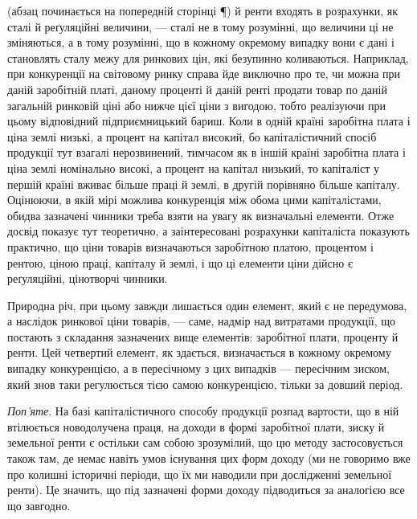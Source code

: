 \parcont{} (абзац починається на попередній сторінці ¶)
й ренти входять в розрахунки, як сталі й реґуляційні величини, — сталі не в тому
розумінні, що величини ці не зміняються, а в тому розумінні, що в кожному окремому
випадку вони є дані і становлять сталу межу для ринкових цін, які безупинно
коливаються. Наприклад, при конкуренції на світовому ринку справа
йде виключно про те, чи можна при даній заробітній платі, даному проценті й
даній ренті продати товар по даній загальній ринковій ціні або нижче цієї ціни
з вигодою, тобто реалізуючи при цьому відповідний підприємницький бариш.
Коли в одній країні заробітна плата і ціна землі низькі, а процент на капітал
високий, бо капіталістичний спосіб продукції тут взагалі нерозвинений,
тимчасом як в іншій країні заробітна плата і ціна землі номінально високі, а
процент на капітал низький, то капіталіст у першій країні вживає більше праці
й землі, в другій порівняно більше капіталу. Оцінюючи, в якій мірі можлива
конкуренція між обома цими капіталістами, обидва зазначені чинники треба
взяти на увагу як визначальні елементи. Отже досвід показує тут теоретично, а
заінтересовані розрахунки капіталіста показують практично, що ціни товарів
визначаються заробітною платою, процентом і рентою, ціною праці, капіталу
й землі, і що ці елементи ціни дійсно є реґуляційні, цінотворчі чинники.

Природна річ, при цьому завжди лишається один елемент, який є не
передумова, а наслідок ринкової ціни товарів, — саме, надмір над витратами продукції, що постають з
складання зазначених вище елементів: заробітної плати,
проценту й ренти. Цей четвертий елемент, як здається, визначається в кожному
окремому випадку конкуренцією, а в пересічному з цих випадків — пересічним
зиском, який знов таки регулюється тією самою конкуренцією, тільки за довший
період.

\emph{Поп’яте}. На базі капіталістичного способу продукції розпад вартости, що
в ній втілюється новодолучена праця, на доходи в формі заробітної плати, зиску
й земельної ренти є остільки сам собою зрозумілий, що цю методу застосовується
також там, де немає навіть умов існування цих форм доходу (ми не говоримо
вже про колишні історичні періоди, що їх ми наводили при дослідженні
земельної ренти). Це значить, що під зазначені форми доходу підводиться за
аналогією все що завгодно.

